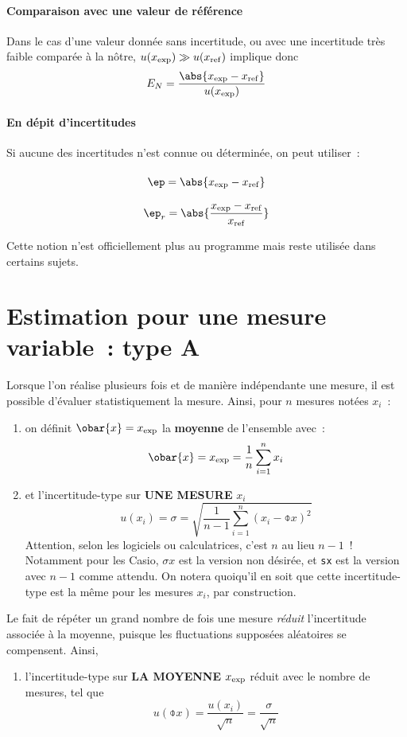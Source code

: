 \documentclass[../main/main.tex]{subfiles}
\begin{document}
\paragraph*{Comparaison avec une valeur de référence}
Dans le cas d'une valeur donnée sans incertitude, ou avec une incertitude
très faible comparée à la nôtre, $u(x_{\rm exp}) \gg u(x_{\rm ref})$ implique
donc
\[
  E_N = \frac{\abs{x_{\rm exp} - x_{\rm ref}}}{u(x_{\rm exp})}
\]

\paragraph*{En dépit d'incertitudes}
Si aucune des incertitudes n'est connue ou déterminée, on peut utiliser~:
\begin{tcolorbox}[blankest]
  \begin{isd}
    \[
      \ep = \abs{x_{\rm exp} - x_{\rm ref}}
      \vphantom{\abs{\frac{x_{\rm exp} - x_{\rm ref}}{x_{\rm ref}}}}
    \]
    \tcblower
    \[
      \ep_r = \abs{\frac{x_{\rm exp} - x_{\rm ref}}{x_{\rm ref}}}
    \]
  \end{isd}
\end{tcolorbox}

Cette notion n'est officiellement plus au programme mais reste utilisée dans
certains sujets.

\section{Estimation pour une mesure variable~: type A}

Lorsque l'on réalise plusieurs fois et de manière indépendante une mesure, il
est possible d'évaluer statistiquement la mesure. Ainsi, pour $n$ mesures notées
$x_i$~:
\begin{enumerate}
  \item on définit $\obar{x} = x_{\rm exp}$ la \textbf{moyenne} de
l'ensemble avec~:
\[
  \obar{x} = x_{\rm exp} = \frac{1}{n} \sum_{i=1}^{n} x_i
\]
 \item et l'incertitude-type sur \textbf{UNE MESURE} $x_i$
\[
  u(x_i) = \sigma =
  \sqrt{\frac{1}{n-1} \sum_{i=1}^{n} (x_i - \obar{x})^{2}}
\]
Attention, selon les logiciels ou calculatrices, c'est $n$ au lieu $n-1$~!
Notamment pour les Casio, \texttt{$\sigma x$} est la version non désirée, et
\texttt{sx} est la version avec $n-1$ comme attendu. On notera quoiqu'il en soit
que cette incertitude-type est la même pour  les mesures $x_i$, par
construction.
\end{enumerate}
Le fait de répéter un grand nombre de fois une mesure \textit{réduit}
l'incertitude associée à la moyenne, puisque les fluctuations supposées
aléatoires se compensent. Ainsi,
\begin{enumerate}[resume]
  \item l'incertitude-type sur \textbf{LA MOYENNE} $x_{\rm exp}$ réduit avec le
    nombre de mesures, tel que
    \[
      u(\obar{x}) = \frac{u(x_i)}{\sqrt{n}} = \frac{\sigma}{\sqrt{n}}
    \]
\end{enumerate}
\end{document}
